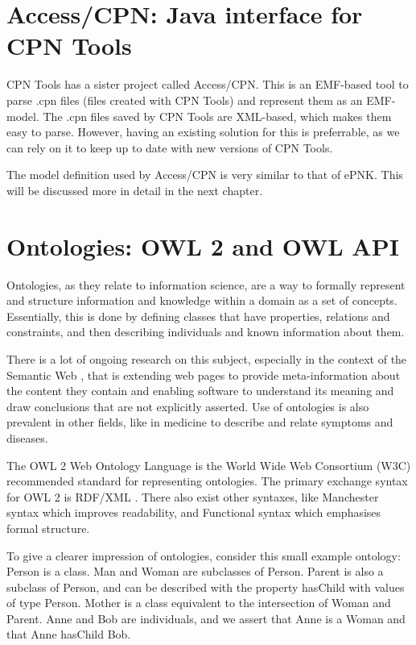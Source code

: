 \section{Access/CPN: Java interface for CPN Tools}
CPN Tools has a sister project called Access/CPN. This is an
EMF-based tool to parse .cpn files (files created with CPN Tools) and represent
them as an EMF-model. The .cpn files saved by CPN Tools are XML-based, which makes them
easy to parse. However, having an existing solution for this is preferrable, as
we can rely on it to keep up to date with new versions of CPN Tools.

The model definition used by Access/CPN is very similar to that of ePNK. This
will be discussed more in detail in the next chapter.

\section{Ontologies: OWL 2 and OWL API}\label{sec:ontologies}

Ontologies, as they relate to information science, are a way to formally
represent and structure information and knowledge within a domain as a set of
concepts. Essentially, this is done by defining classes that have properties,
relations and constraints, and then describing individuals and known information
about them. 

There is a lot of ongoing research on this subject, especially in the context of
the Semantic Web \cite{bernerslee2001semantic}, that is extending web pages to
provide meta-information about the content they contain and enabling software to
understand its meaning and draw conclusions that are not explicitly asserted.
Use of ontologies is also prevalent in other fields, like in medicine to
describe and relate symptoms and diseases.

The OWL 2 Web Ontology Language \cite{owl2-overview} is the World Wide Web
Consortium (W3C) recommended standard for representing ontologies.  The primary
exchange syntax for OWL 2 is RDF/XML \cite{rdf-xml}. There also exist
other syntaxes, like Manchester syntax which improves readability, and
Functional syntax which emphasises formal structure.

To give a clearer impression of ontologies, consider this small example
ontology:
Person is a class. Man and Woman are subclasses of Person. Parent is also a
subclass of Person, and can be described with the property hasChild with values
of type Person. Mother is a class equivalent to the intersection of Woman and
Parent. Anne and Bob are individuals, and we assert that Anne is
a Woman and that Anne hasChild Bob.


